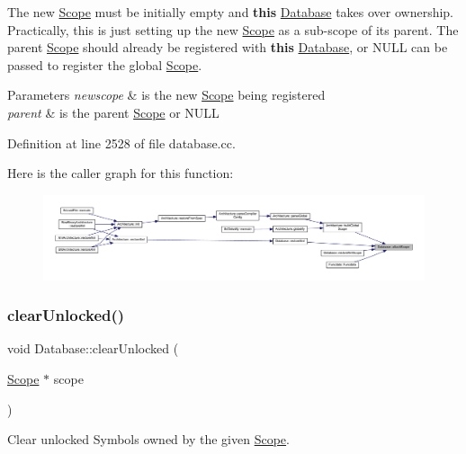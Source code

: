 The new \mbox{\hyperlink{class_scope}{Scope}} must be initially empty and {\bfseries{this}} \mbox{\hyperlink{class_database}{Database}} takes over ownership. Practically, this is just setting up the new \mbox{\hyperlink{class_scope}{Scope}} as a sub-\/scope of its parent. The parent \mbox{\hyperlink{class_scope}{Scope}} should already be registered with {\bfseries{this}} \mbox{\hyperlink{class_database}{Database}}, or N\+U\+LL can be passed to register the global \mbox{\hyperlink{class_scope}{Scope}}. 
\begin{DoxyParams}{Parameters}
{\em newscope} & is the new \mbox{\hyperlink{class_scope}{Scope}} being registered \\
\hline
{\em parent} & is the parent \mbox{\hyperlink{class_scope}{Scope}} or N\+U\+LL \\
\hline
\end{DoxyParams}


Definition at line 2528 of file database.\+cc.

Here is the caller graph for this function\+:
\nopagebreak
\begin{figure}[H]
\begin{center}
\leavevmode
\includegraphics[width=350pt]{class_database_a1bc096166a8cfde3d77229c9e38bfabf_icgraph}
\end{center}
\end{figure}
\mbox{\label{class_database_ab7749ce6cebbb4f7520baa7a6177ab33}} 
\subsubsection{\texorpdfstring{clearUnlocked()}{clearUnlocked()}}
{\footnotesize\ttfamily void Database\+::clear\+Unlocked (\begin{DoxyParamCaption}\item[{\mbox{\hyperlink{class_scope}{Scope}} $\ast$}]{scope }\end{DoxyParamCaption})}



Clear unlocked Symbols owned by the given \mbox{\hyperlink{class_scope}{Scope}}. 

